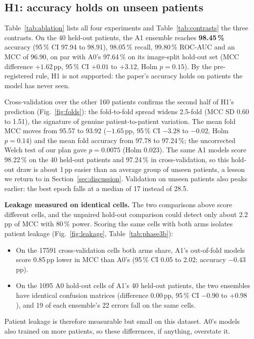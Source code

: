 \documentclass[conference]{IEEEtran}
\begin{document}
\subsection{H1: accuracy holds on unseen patients}
Table~\ref{tab:ablation} lists all four experiments and Table~\ref{tab:contrasts} the three contrasts. On the 40 held-out patients, the A1 ensemble reaches \textbf{98.45\,\%} accuracy (95\,\% CI 97.94 to 98.91), 98.05\,\% recall, 99.80\,\% ROC-AUC and an MCC of 96.90, on par with A0's 97.64\,\% on its image-split hold-out set (MCC difference $+1.62$\,pp, 95\,\% CI $+0.01$ to $+3.12$, Holm $p=0.15$). By the pre-registered rule, H1 is not supported: the paper's accuracy holds on patients the model has never seen.

Cross-validation over the other 160 patients confirms the second half of H1's prediction (Fig.~\ref{fig:folds}): the fold-to-fold spread widens 2.5-fold (MCC SD 0.60 to 1.51), the signature of genuine patient-to-patient variation. The mean fold MCC moves from 95.57 to 93.92 ($-1.65$\,pp, 95\,\% CI $-3.28$ to $-0.02$, Holm $p=0.14$) and the mean fold accuracy from 97.78 to 97.24\,\%; the uncorrected Welch test of our plan gave $p=0.0075$ (Holm 0.023). The same A1 models score 98.22\,\% on the 40 held-out patients and 97.24\,\% in cross-validation, so this hold-out draw is about 1\,pp easier than an average group of unseen patients, a lesson we return to in Section~\ref{sec:discussion}. Validation on unseen patients also peaks earlier: the best epoch falls at a median of 17 instead of 28.5.

\textbf{Leakage measured on identical cells.} The two comparisons above score different cells, and the unpaired hold-out comparison could detect only about 2.2\,pp of MCC with 80\,\% power. Scoring the same cells with both arms isolates patient leakage (Fig.~\ref{fig:leakage}, Table~\ref{tab:phase3b}):
\begin{itemize}
\item On the \num{17591} cross-validation cells both arms share, A1's out-of-fold models score 0.85\,pp lower in MCC than A0's (95\,\% CI 0.05 to 2.02; accuracy $-0.43$\,pp).
\item On the \num{1095} A0 hold-out cells of A1's 40 held-out patients, the two ensembles have identical confusion matrices (difference 0.00\,pp, 95\,\% CI $-0.90$ to $+0.98$), and 19 of each ensemble's 22 errors fall on the same cells.
\end{itemize}
Patient leakage is therefore measurable but small on this dataset. A0's models also trained on more patients, so these differences, if anything, overstate it.
\end{document}
